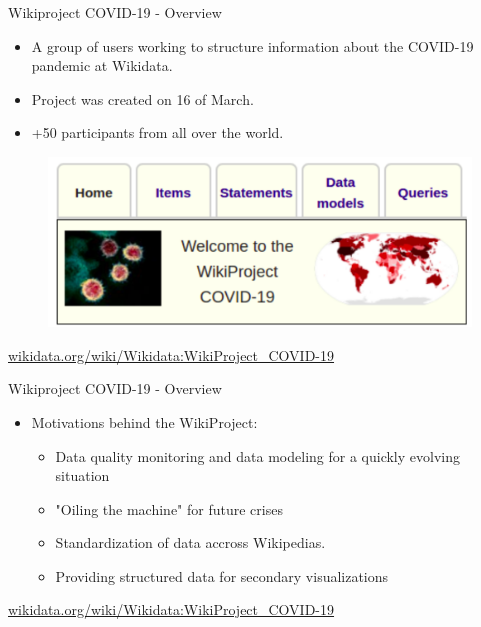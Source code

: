 \documentclass{beamer}
\begin{document}
\begin{frame}{Wikiproject COVID-19 - Overview}

\begin{itemize}
    \item A group of users working to structure information about the COVID-19 pandemic at Wikidata.
    \item Project was created on 16 of March.
    \item +50 participants from all over the world.
\end{itemize}

\begin{figure}
\includegraphics[scale=0.65]{fig/covid_banner.png}
\end{figure}
\vskip 2cm

\url{wikidata.org/wiki/Wikidata:WikiProject_COVID-19}

\end{frame}

\begin{frame}{Wikiproject COVID-19 - Overview}

\begin{itemize}
    \item Motivations behind the WikiProject:
    \begin{itemize}
        \item Data quality monitoring and data modeling for a quickly evolving situation
        \item "Oiling the machine" for future crises
        \item Standardization of data accross Wikipedias. 
        \item Providing structured data for secondary visualizations
    \end{itemize}
\end{itemize}

\url{wikidata.org/wiki/Wikidata:WikiProject_COVID-19}

\end{frame}
\end{document}

